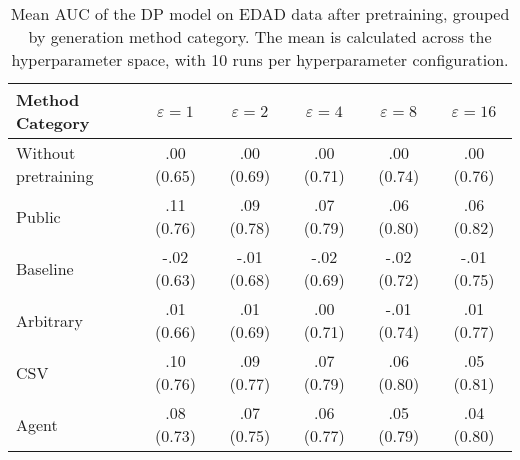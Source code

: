 \begin{table}[h!]
    \centering
    \caption{Mean AUC of the DP model on EDAD data after pretraining, grouped by generation method category. The mean is calculated across the hyperparameter space, with 10 runs per hyperparameter configuration.}
    \label{tab:epsilon_comparison}
    \begin{tabular}{lccccc}
    \toprule
    Method Category & $\varepsilon=1$ & $\varepsilon=2$ & $\varepsilon=4$ & $\varepsilon=8$ & $\varepsilon=16$ \\
    \midrule
    Without pretraining & .00 {\small (0.65)} & .00 {\small (0.69)} & .00 {\small (0.71)} & .00 {\small (0.74)} & .00 {\small (0.76)} \\
    \arrayrulecolor{black!50!}\midrule
    Public & \cellcolor{gold!30}.11 {\small (0.76)} & \cellcolor{gold!30}.09 {\small (0.78)} & \cellcolor{gold!30}.07 {\small (0.79)} & \cellcolor{silver!30}.06 {\small (0.80)} & \cellcolor{gold!30}.06 {\small (0.82)} \\
    \arrayrulecolor{black!50!}\midrule
    Baseline & -.02 {\small (0.63)} & -.01 {\small (0.68)} & -.02 {\small (0.69)} & -.02 {\small (0.72)} & -.01 {\small (0.75)} \\
    \arrayrulecolor{black!50!}\midrule
    Arbitrary & .01 {\small (0.66)} & .01 {\small (0.69)} & .00 {\small (0.71)} & -.01 {\small (0.74)} & .01 {\small (0.77)} \\
    \arrayrulecolor{black!50!}\midrule
    CSV & \cellcolor{silver!30}.10 {\small (0.76)} & \cellcolor{silver!30}.09 {\small (0.77)} & \cellcolor{silver!30}.07 {\small (0.79)} & \cellcolor{gold!30}.06 {\small (0.80)} & \cellcolor{silver!30}.05 {\small (0.81)} \\
    Agent & \cellcolor{bronze!30}.08 {\small (0.73)} & \cellcolor{bronze!30}.07 {\small (0.75)} & \cellcolor{bronze!30}.06 {\small (0.77)} & \cellcolor{bronze!30}.05 {\small (0.79)} & \cellcolor{bronze!30}.04 {\small (0.80)} \\
    \bottomrule
    \end{tabular}
\end{table}